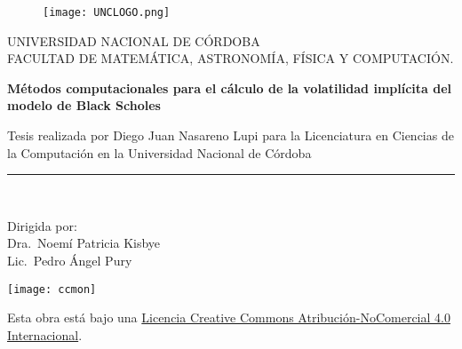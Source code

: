 \documentclass[a4paper, 12pt]{book}
\begin{document}


\begin{titlepage}
\begin{center}


\begin{figure}
  \begin{center}
    \leavevmode

    \texttt{[image: UNCLOGO.png]}
  \end{center}
\end{figure}

\vspace*{0.4in}
UNIVERSIDAD NACIONAL DE C\'ORDOBA\\
\vspace*{0.15in}
FACULTAD DE MATEM\'ATICA, ASTRONOMÍA, F\'ISICA Y COMPUTACI\'ON.\\
\vspace*{0.15in}
\begin{large}
\end{large}
\vspace*{0.2in}
\begin{Large}
\textbf{M\'etodos computacionales para el c\'alculo de la volatilidad impl\'icita del modelo de Black Scholes} \\
\end{Large}
\vspace*{0.3in}
\begin{large}
Tesis realizada por Diego Juan Nasareno Lupi para la Licenciatura en Ciencias de la Computaci\'on en la Universidad Nacional de C\'ordoba\end{large}

\vspace*{0.1in}
\rule{80mm}{0.1mm}\\
\vspace*{0.1in}
\begin{large}
Dirigida por: \\
Dra.\ Noem\'i Patricia Kisbye \\
Lic.\ Pedro \'Angel Pury\\
\vspace*{0.2in}
\end{large}
\end{center}

\begin{center}
    \texttt{[image: ccmon]}
\end{center}
Esta obra está bajo una \textcolor{blue}{\href{http://creativecommons.org/licenses/by-nc/4.0/}{Licencia Creative Commons Atribución-NoComercial 4.0 Internacional}}.

\end{titlepage}
\end{document}
